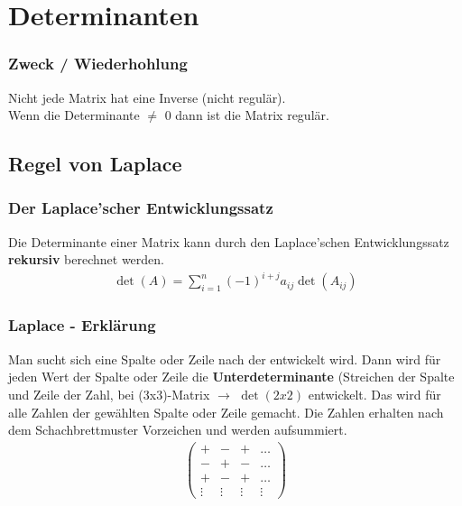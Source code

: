 \section{Determinanten}
\begin{frame}
    \frametitle{Zweck / Wiederhohlung}
    Nicht jede Matrix hat eine Inverse (nicht regulär). \\
    Wenn die Determinante $\neq$ 0 dann ist die Matrix regulär. 
\end{frame}

\subsection{Regel von Laplace}

\begin{frame}
	\frametitle{Der Laplace'scher Entwicklungssatz}
	Die Determinante einer Matrix kann durch den Laplace'schen Entwicklungssatz \textbf{rekursiv} berechnet werden.
	\begin{gather*}
	\det(A) = \sum_{i=1}^n (-1)^{i+j} a_{ij} \det(A_{ij})
	\end{gather*}
\end{frame}

\begin{frame}
	 \frametitle{Laplace - Erklärung}
	Man sucht sich eine Spalte oder Zeile nach der entwickelt wird. 
	Dann wird für jeden Wert der Spalte oder Zeile die \textbf{Unterdeterminante} (Streichen der Spalte und Zeile der Zahl, bei (3x3)-Matrix $\rightarrow$ $\det(2x2)$ entwickelt.
	Das wird für alle Zahlen der gewählten Spalte oder Zeile gemacht.
	Die Zahlen erhalten nach dem Schachbrettmuster Vorzeichen und werden aufsummiert.
	\begin{gather*}
	\begin{pmatrix}
	+ & - & + & \dots \\
	- & + & - & \dots \\
	+ & - & + & \dots \\
	\vdots &  \vdots & \vdots & \vdots 
	\end{pmatrix}
	\end{gather*}
\end{frame}

